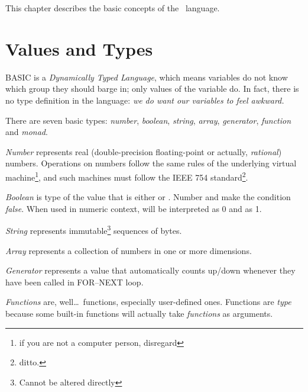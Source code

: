 \quad
{}

This chapter describes the basic concepts of the \tbas\ language.


\section{Values and Types}
\label{valuesandtypes}

BASIC is a \emph{Dynamically Typed Language}, which means variables do not know which group they should barge in; only values of the variable do. In fact, there is no type definition in the language: \emph{we do want our variables to feel awkward.}

There are seven basic types: \emph{number}, \emph{boolean}, \emph{string},  \emph{array}, \emph{generator}, \emph{function} and \emph{monad}.

\emph{Number} represents real (double-precision floating-point or actually, \emph{rational}) numbers. Operations on numbers follow the same rules of the underlying virtual machine\footnote{if you are not a computer person, disregard}, and such machines must follow the IEEE 754 standard\footnote{ditto.}. 

\emph{Boolean} is type of the value that is either  or . Number  and  make the condition \emph{false}. When used in numeric context,  will be interpreted as 0 and  as 1.

\emph{String} represents immutable\footnote{Cannot be altered directly} sequences of bytes.

\emph{Array} represents a collection of numbers in one or more dimensions.

\emph{Generator} represents a value that automatically counts up/down whenever they have been called in FOR--NEXT loop.

\emph{Functions} are, well\ldots\ functions, especially user-defined ones. Functions are \emph{type} because some built-in functions will actually take \emph{functions} as arguments.

